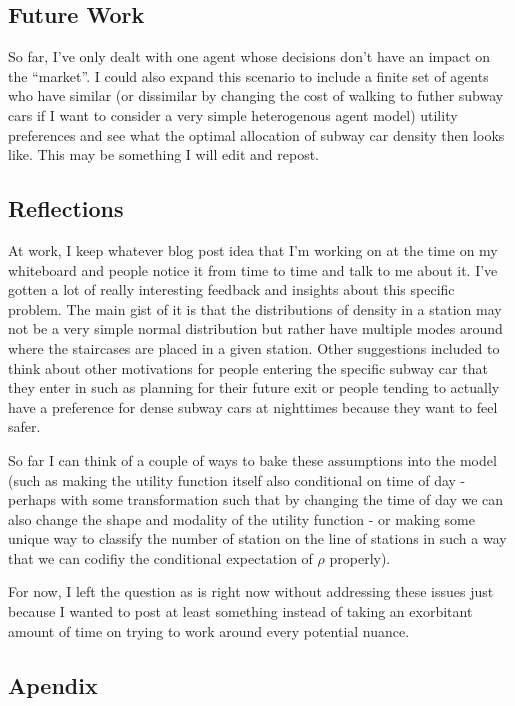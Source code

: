 \documentclass[11pt]{article}
\begin{document}
    \hypertarget{future-work}{%
\subsection{Future Work}\label{future-work}}

So far, I've only dealt with one agent whose decisions don't have an
impact on the ``market''. I could also expand this scenario to include a
finite set of agents who have similar (or dissimilar by changing the
cost of walking to futher subway cars if I want to consider a very
simple heterogenous agent model) utility preferences and see what the
optimal allocation of subway car density then looks like. This may be
something I will edit and repost.

    \hypertarget{reflections}{%
\subsection{Reflections}\label{reflections}}

At work, I keep whatever blog post idea that I'm working on at the time
on my whiteboard and people notice it from time to time and talk to me
about it. I've gotten a lot of really interesting feedback and insights
about this specific problem. The main gist of it is that the
distributions of density in a station may not be a very simple normal
distribution but rather have multiple modes around where the staircases
are placed in a given station. Other suggestions included to think about
other motivations for people entering the specific subway car that they
enter in such as planning for their future exit or people tending to
actually have a preference for dense subway cars at nighttimes because
they want to feel safer.

So far I can think of a couple of ways to bake these assumptions into
the model (such as making the utility function itself also conditional
on time of day - perhaps with some transformation such that by changing
the time of day we can also change the shape and modality of the utility
function - or making some unique way to classify the number of station
on the line of stations in such a way that we can codifiy the
conditional expectation of \(\rho\) properly).

For now, I left the question as is right now without addressing these
issues just because I wanted to post at least something instead of
taking an exorbitant amount of time on trying to work around every
potential nuance.

    \hypertarget{apendix}{%
\subsection{Apendix}\label{apendix}}
\end{document}
